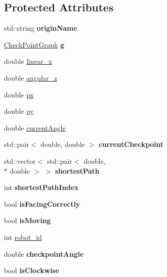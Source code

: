 \subsection*{Protected Attributes}
\begin{DoxyCompactItemize}
\item 
\hypertarget{classAgent_ae9ddc8a7bffee9c921d6628e6669df9c}{std\-::string {\bfseries origin\-Name}}\label{classAgent_ae9ddc8a7bffee9c921d6628e6669df9c}

\item 
\hypertarget{classAgent_a9c296226b7db0471d7a721dabe849c46}{\hyperlink{classCheckPointGraph}{Check\-Point\-Graph} {\bfseries g}}\label{classAgent_a9c296226b7db0471d7a721dabe849c46}

\item 
double \hyperlink{classAgent_a77dfc60513d8c90b2848297e09fffba7}{linear\-\_\-x}
\item 
double \hyperlink{classAgent_affc842049c5010a5f8bd99a62d650a25}{angular\-\_\-z}
\item 
double \hyperlink{classAgent_af51536ae3b511b53726b84b9226cc772}{px}
\item 
double \hyperlink{classAgent_a048e8b32d02a2fd58f046a444a287015}{py}
\item 
double \hyperlink{classAgent_a389e3229e62da28d6c686354329e25aa}{current\-Angle}
\item 
\hypertarget{classAgent_a0ca673bd13a3e9aa8235db73eb4b5391}{std\-::pair$<$ double, double $>$ {\bfseries current\-Checkpoint}}\label{classAgent_a0ca673bd13a3e9aa8235db73eb4b5391}

\item 
\hypertarget{classAgent_ac7175c1ed11e2b571d434bd25f4c096f}{std\-::vector$<$ std\-::pair$<$ double, \\*
double $>$ $>$ {\bfseries shortest\-Path}}\label{classAgent_ac7175c1ed11e2b571d434bd25f4c096f}

\item 
\hypertarget{classAgent_aa1f106d069420fb5995338cfa4f8799b}{int {\bfseries shortest\-Path\-Index}}\label{classAgent_aa1f106d069420fb5995338cfa4f8799b}

\item 
\hypertarget{classAgent_afeaa67851b662b45d4d6fcd5eaf5acc3}{bool {\bfseries is\-Facing\-Correctly}}\label{classAgent_afeaa67851b662b45d4d6fcd5eaf5acc3}

\item 
\hypertarget{classAgent_aab5675be1775cd18ff37e3e1870d51be}{bool {\bfseries is\-Moving}}\label{classAgent_aab5675be1775cd18ff37e3e1870d51be}

\item 
int \hyperlink{classAgent_aefcf2085a669d7e91d932e7cc3ee88ce}{robot\-\_\-id}
\item 
\hypertarget{classAgent_a894e975009220db4a8faa7c23fc0b4d6}{double {\bfseries checkpoint\-Angle}}\label{classAgent_a894e975009220db4a8faa7c23fc0b4d6}

\item 
\hypertarget{classAgent_ae4169e63cd18fa7785d4561746f676d1}{bool {\bfseries is\-Clockwise}}\label{classAgent_ae4169e63cd18fa7785d4561746f676d1}

\end{DoxyCompactItemize}


